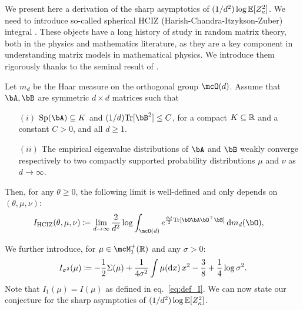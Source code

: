 We present here a derivation of the sharp asymptotics of $(1/d^2) \log \mathbb{E}[Z_\kappa^2]$.
We need to introduce so-called spherical HCIZ (Harish-Chandra-Itzykson-Zuber) integral \citep{harish1957differential,itzykson1980planar}. 
These objects have a long history of study in random matrix theory, 
both in the physics
\citep{matytsin1994large,matytsin1997kosterlitz,bun2014instanton,maillard2021perturbative} 
and mathematics \citep{guionnet2002large,collins2003moments,guionnet2004first,guionnet2022rare} 
literature, as they are a key component in understanding matrix models in mathematical physics.
We introduce them rigorously thanks to the seminal result of \cite{guionnet2002large}.
\begin{theorem}
    \label{thm:hciz}
    Let $m_d$ be the Haar measure on the orthogonal group $\mcO(d)$. Assume that $\bA, \bB$ are symmetric $d \times d$ matrices such that 
    \begin{itemize}
        \item[$(i)$] $\Sp(\bA) \subseteq K$ and $(1/d) \Tr[\bB^2] \leq C$, for a compact $K \subseteq \mathbb{R}$ and a constant $C > 0$, and all $d \geq 1$.
        \item[$(ii)$] The empirical eigenvalue distributions of $\bA$ and $\bB$ weakly converge respectively to two compactly supported probability distributions $\mu$ and $\nu$ as $d \to \infty$.
    \end{itemize}
    Then, for any $\theta \geq 0$, the following limit is well-defined and only depends on $(\theta, \mu, \nu)$:
    \begin{align}\label{eq:def_hciz}
        I_\HCIZ(\theta, \mu, \nu) &\coloneqq \lim_{d \to \infty} \frac{2}{d^2} \log \int_{\mcO(d)} e^{\frac{\theta d}{2} \Tr[\bO \bA \bO^\T \bB]} \, \rd m_d(\bO),
    \end{align}
\end{theorem}
\noindent
We further introduce, for $\mu \in \mcM_1^+(\bbR)$ and any $\sigma > 0$:
    \begin{equation}
        \label{eq:def_I_sigma}
        I_{\sigma^2}(\mu) \coloneqq -\frac{1}{2} \Sigma(\mu) + \frac{1}{4 \sigma^2} \int \mu(\mathrm{d} x) \, x^2 - \frac{3}{8} + \frac{1}{4} \log \sigma^2.
    \end{equation}
Note that $I_1(\mu) = I(\mu)$ as defined in eq.~\eqref{eq:def_I}.
We can now state our conjecture for the sharp asymptotics of $(1/d^2) \log \mathbb{E}[Z_\kappa^2]$.
